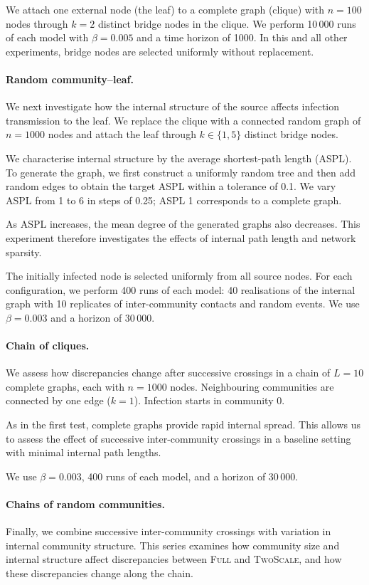 \documentclass[a4paper,fleqn]{cas-sc}
\newcommand{\Full}{\textup{\textsc{Full}}}
\newcommand{\TS}{\textup{\textsc{TwoScale}}}
\begin{document}
We attach one external node (the leaf) to a complete graph (clique) with $n=100$ nodes through $k=2$ distinct bridge nodes in the clique. We perform 10\,000 runs of each model with $\beta=0.005$ and a time horizon of 1000. In this and all other experiments, bridge nodes are selected uniformly without replacement.

\paragraph{Random community--leaf.}
We next investigate how the internal structure of the source affects infection transmission to the leaf. We replace the clique with a connected random graph of $n=1000$ nodes and attach the leaf through $k\in\{1,5\}$ distinct bridge nodes.

We characterise internal structure by the average shortest-path length (ASPL). To generate the graph, we first construct a uniformly random tree and then add random edges to obtain the target ASPL within a tolerance of 0.1. We vary ASPL from 1 to 6 in steps of 0.25; ASPL 1 corresponds to a complete graph.

As ASPL increases, the mean degree of the generated graphs also decreases. This experiment therefore investigates the effects of internal path length and network sparsity.

The initially infected node is selected uniformly from all source nodes. For each configuration, we perform 400 runs of each model: 40 realisations of the internal graph with 10 replicates of inter-community contacts and random events. We use $\beta=0.003$ and a horizon of 30\,000.

\paragraph{Chain of cliques.}
We assess how discrepancies change after successive crossings in a chain of $L=10$ complete graphs, each with $n=1000$ nodes. Neighbouring communities are connected by one edge ($k=1$). Infection starts in community 0.

As in the first test, complete graphs provide rapid internal spread. This allows us to assess the effect of successive inter-community crossings in a baseline setting with minimal internal path lengths.

We use $\beta=0.003$, 400 runs of each model, and a horizon of 30\,000.

\paragraph{Chains of random communities.}
Finally, we combine successive inter-community crossings with variation in internal community structure. This series examines how community size and internal structure affect discrepancies between \Full{} and \TS{}, and how these discrepancies change along the chain.
\end{document}
